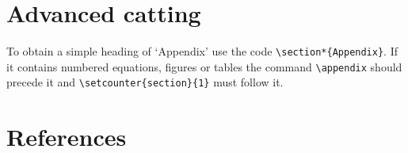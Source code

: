\documentclass[12pt]{iopart}
\begin{document}
\appendix
\section{Advanced catting}

To obtain a simple heading of
`Appendix' use the code \verb"\section*{Appendix}". If it contains
numbered equations, figures or tables the command \verb"\appendix" should
precede it and \verb"\setcounter{section}{1}" must follow it.

\section*{References}


    \ifboyscout
    \clearpage %

    \clearpage %

    \fi %
\end{document}
